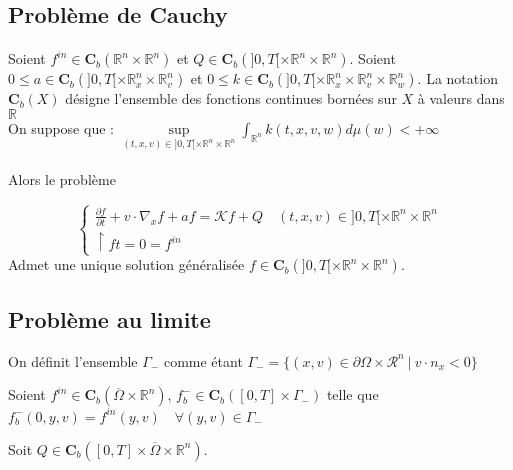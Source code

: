 \documentclass[onecolumn, 12pt, a4paper]{article}
\begin{document}
\subsection{Problème de Cauchy}
\paragraph{}



Soient $f^{in} \in \mathbf{C}_b(\mathbb{R}^n \times \mathbb{R}^n)$ et $Q \in \mathbf{C}_b(]0,T[ \times \mathbb{R}^n \times \mathbb{R}^n)$.
Soient $0 \leq a \in \mathbf{C}_b(]0,T[ \times \mathbb{R}_x^n \times \mathbb{R}_v^n)$ et $0 \leq k \in \mathbf{C}_b(]0,T[ \times \mathbb{R}_x^n \times \mathbb{R}_v^n \times \mathbb{R}_w^n)$. La notation $\mathbf{C}_b(X)$ désigne l'ensemble des fonctions continues bornées sur $X$ à valeurs dans $\mathbb{R}$\\


On suppose que :  $\underset{(t,x,v) \in ]0,T[ \times \mathbb{R}^n \times \mathbb{R}^n}{\sup} \int_{\mathbb{R}^n} k(t,x,v,w)d\mu(w) < +\infty$

\paragraph{}

Alors le problème 

\[
\begin{cases}
\frac{\partial f}{\partial t}+v \cdot \nabla_x f +af =   \mathcal{K} f +Q \quad (t,x,v) \in ]0,T[ \times \mathbb{R}^n \times \mathbb{R}^n\\
\restriction{f}{t=0}= f^{in}
\end{cases}
\]
Admet une unique solution généralisée $f \in \mathbf{C}_b(]0,T[ \times \mathbb{R}^n \times \mathbb{R}^n)$.

\subsection{Problème au limite}

On définit l'ensemble $\Gamma_-$ comme étant $\Gamma_-= \{(x,v) \in \partial \Omega \times \mathcal{R}^n ~ | ~ v\cdot n_x<0\}$

Soient $f^{in} \in \mathbf{C}_b(\overline{\Omega} \times \mathbb{R}^n)$, $f_b^- \in \mathbf{C}_b([0,T] \times \Gamma_-)$ telle que $f_b^-(0,y,v)=f^{in}(y,v) \quad \forall (y,v) \in \Gamma_-$

Soit $Q \in \mathbf{C}_b([0,T] \times \overline{\Omega} \times \mathbb{R}^n)$.
\end{document}
